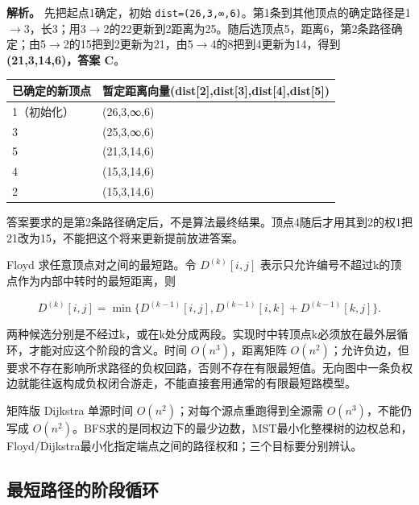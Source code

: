 \textbf{解析。} 先把起点1确定，初始 \texttt{dist=\allowbreak{}(\allowbreak{}26,\allowbreak{}3,\allowbreak{}∞,\allowbreak{}6)\allowbreak{}}。第1条到其他顶点的确定路径是1\ensuremath{\to}3，长3；用3\ensuremath{\to}2的22更新到2距离为25。随后选顶点5，距离6，第2条路径确定；由5\ensuremath{\to}2的15把到2更新为21，由5\ensuremath{\to}4的8把到4更新为14，得到 \textbf{(21,3,14,6)，答案 C}。

\begin{wideblock}

\par\medskip\noindent\begin{minipage}{\linewidth}\fontsize{9.3}{12}\selectfont\begin{tabularx}{\linewidth}{@{}YY@{}}
\toprule\noalign{}
已确定的新顶点 & 暂定距离向量(dist{[}2{]},dist{[}3{]},dist{[}4{]},dist{[}5{]}) \\
\midrule\noalign{}


1（初始化） & (26,3,∞,6) \\
3 & (25,3,∞,6) \\
5 & (21,3,14,6) \\
4 & (15,3,14,6) \\
2 & (15,3,14,6) \\
\bottomrule\end{tabularx}
\end{minipage}\par\medskip

\end{wideblock}

答案要求的是第2条路径确定后，不是算法最终结果。顶点4随后才用其到2的权1把21改为15，不能把这个将来更新提前放进答案。

Floyd 求任意顶点对之间的最短路。令 \(D^{(k)}[i,j]\) 表示只允许编号不超过k的顶点作为内部中转时的最短距离，则

\[D^{(k)}[i,j]=\min\{D^{(k-1)}[i,j],D^{(k-1)}[i,k]+D^{(k-1)}[k,j]\}.\]

两种候选分别是不经过k，或在k处分成两段。实现时中转顶点k必须放在最外层循环，才能对应这个阶段的含义。时间 \(O(n^3)\)，距离矩阵 \(O(n^2)\)；允许负边，但要求不存在影响所求路径的负权回路，否则不存在有限最短值。无向图中一条负权边就能往返构成负权闭合游走，不能直接套用通常的有限最短路模型。

矩阵版 Dijkstra 单源时间 \(O(n^2)\)；对每个源点重跑得到全源需 \(O(n^3)\)，不能仍写成 \(O(n^2)\)。BFS求的是同权边下的最少边数，MST最小化整棵树的边权总和，Floyd/Dijkstra最小化指定端点之间的路径权和；三个目标要分别辨认。

\subsection{最短路径的阶段循环}\label{DS06-shortest-code}

